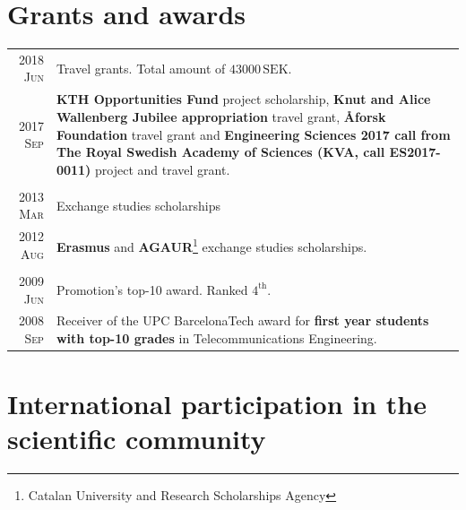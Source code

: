 \documentclass[a4paper,10pt]{article}
\begin{document}
  \section{Grants and awards}
    \begin{savenotes}
    \begin{tabular}{r|p{13cm}}
      
      \textsc{2018 Jun} & Travel grants. Total amount of $43000\,\mathrm{SEK}$.\\
      \textsc{2017 Sep} & \footnotesize{\textbf{KTH Opportunities Fund} project scholarship,
			  \textbf{Knut and Alice Wallenberg Jubilee appropriation} travel grant,
			  \textbf{\AA forsk Foundation} travel grant and 
			  \textbf{Engineering Sciences 2017 call from The Royal Swedish
			  Academy of Sciences (KVA, call ES2017-0011)} project and travel 
			  grant.} \\
      \multicolumn{2}{c}{} \\
      
      \textsc{2013 Mar} & Exchange studies scholarships \\ 
      \textsc{2012 Aug} & \footnotesize{\textbf{Erasmus} and \textbf{AGAUR}\footnote{Catalan University and Research Scholarships Agency} exchange studies scholarships.}  \\
      \multicolumn{2}{c}{} \\

      \textsc{2009 Jun}	& Promotion's top-10 award. Ranked $4^{\mathrm{th}}$. \\
      \textsc{2008 Sep}	& \footnotesize{Receiver of the UPC BarcelonaTech award for \textbf{first 
			  year students with top-10 grades} in Telecommunications Engineering.} \\

    \end{tabular}
    \end{savenotes}

  
  \section{International participation in the scientific community}
\end{document}

